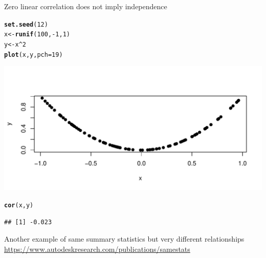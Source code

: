 \documentclass[10pt]{beamer}\usepackage[]{graphicx}\usepackage[]{color}
\makeatletter
\def\maxwidth{ %
  \ifdim\Gin@nat@width>\linewidth
    \linewidth
  \else
    \Gin@nat@width
  \fi
}
\newcommand{\hlnum}[1]{\textcolor[rgb]{0.686,0.059,0.569}{#1}}%
\newcommand{\hlopt}[1]{\textcolor[rgb]{0,0,0}{#1}}%
\newcommand{\hlstd}[1]{\textcolor[rgb]{0.345,0.345,0.345}{#1}}%
\newcommand{\hlkwb}[1]{\textcolor[rgb]{0.69,0.353,0.396}{#1}}%
\newcommand{\hlkwc}[1]{\textcolor[rgb]{0.333,0.667,0.333}{#1}}%
\newcommand{\hlkwd}[1]{\textcolor[rgb]{0.737,0.353,0.396}{\textbf{#1}}}%
\newenvironment{kframe}{%
 \def\at@end@of@kframe{}%
 \ifinner\ifhmode%
  \def\at@end@of@kframe{\end{minipage}}%
  \begin{minipage}{\columnwidth}%
 \fi\fi%
 \def\FrameCommand##1{\hskip\@totalleftmargin \hskip-\fboxsep
 \colorbox{shadecolor}{##1}\hskip-\fboxsep
     \hskip-\linewidth \hskip-\@totalleftmargin \hskip\columnwidth}%
 \MakeFramed {\advance\hsize-\width
   \@totalleftmargin\z@ \linewidth\hsize
   \@setminipage}}%
 {\par\unskip\endMakeFramed%
 \at@end@of@kframe}
\newenvironment{knitrout}{}{} %
\makeatother
\begin{document}
\begin{frame}[fragile]{Zero linear correlation does not imply independence}
\begin{knitrout}\scriptsize
{}\color{fgcolor}\begin{kframe}
\begin{alltt}
\hlkwd{set.seed}\hlstd{(}\hlnum{12}\hlstd{)}
\hlstd{x} \hlkwb{<-} \hlkwd{runif}\hlstd{(}\hlnum{100}\hlstd{,}\hlopt{-}\hlnum{1}\hlstd{,}\hlnum{1}\hlstd{)}
\hlstd{y} \hlkwb{<-} \hlstd{x}\hlopt{^}\hlnum{2}
\hlkwd{plot}\hlstd{(x,y,} \hlkwc{pch} \hlstd{=} \hlnum{19}\hlstd{)}
\end{alltt}
\end{kframe}

{\centering \includegraphics[width=\maxwidth]{figure/unnamed-chunk-8-1} 

}


\begin{kframe}\begin{alltt}
\hlkwd{cor}\hlstd{(x,y)}
\end{alltt}
\begin{verbatim}
## [1] -0.023
\end{verbatim}
\end{kframe}
\end{knitrout}
\end{frame}


\begin{frame}{Another example of same summary statistics but very different relationships}
\url{https://www.autodeskresearch.com/publications/samestats}
\end{frame}
\end{document}
